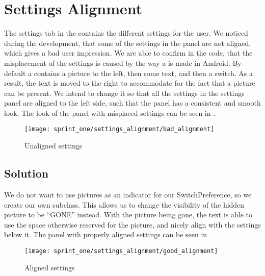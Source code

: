 \section{Settings Alignment}
\label{sec:settings_alignment}

The settings tab in the \launcher contains the different settings for the user. We noticed during the development, that some of the settings in the panel are not aligned, which gives a bad user impression. We are able to confirm in the code, that the misplacement of the settings is caused by the way a  is made in Android. By default a  contains a picture to the left, then some text, and then a switch. As a result, the text is moved to the right to accommodate for the fact that a picture can be present. We intend to change it so that all the settings in the settings panel are aligned to the left side, such that the panel has a consistent and smooth look. The look of the panel with misplaced settings can be seen in .

\begin{figure}[!htbp]
    \centering
    \texttt{[image: sprint\_one/settings\_alignment/bad\_alignment]}
    \caption{Unaligned settings}
    \label{fig:settings_alignment_bad}
\end{figure}

\subsection{Solution} 
\label{sub:settings_alignment_solution}
We do not want to use pictures as an indicator for our SwitchPreference, so we create our own  subclass. This allows us to change the visibility of the hidden picture to be ``GONE'' instead. With the picture being gone, the text is able to use the space otherwise reserved for the picture, and nicely align with the settings below it. The panel with properly aligned settings can be seen in 

\begin{figure}[!htbp]
    \centering
    \texttt{[image: sprint\_one/settings\_alignment/good\_alignment]}
    \caption{Aligned settings}
    \label{fig:settings_alignment_good}
\end{figure}